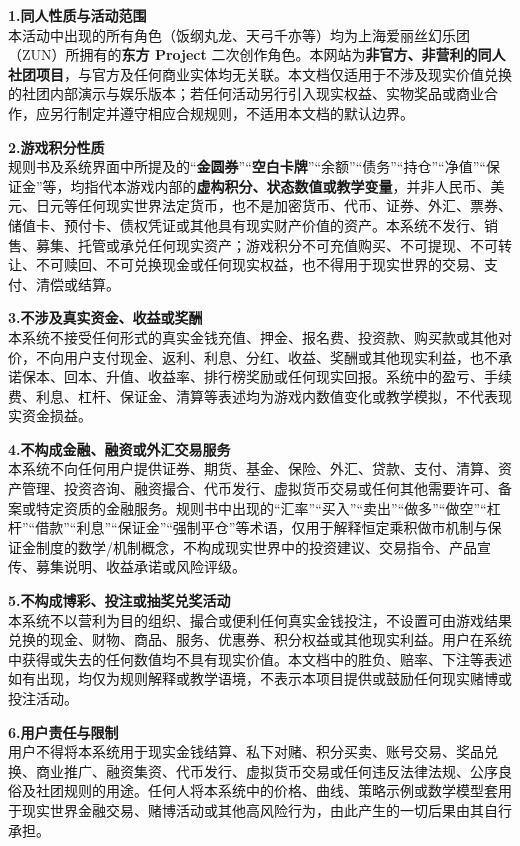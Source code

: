 \documentclass[11pt,a4paper,twoside]{article}
\begin{document}
\textbf{1.\;同人性质与活动范围}\\
本活动中出现的所有角色（饭纲丸龙、天弓千亦等）均为上海爱丽丝幻乐团（ZUN）所拥有的\textbf{东方 Project} 二次创作角色。本网站为\textbf{非官方、非营利的同人社团项目}，与官方及任何商业实体均无关联。本文档仅适用于不涉及现实价值兑换的社团内部演示与娱乐版本；若任何活动另行引入现实权益、实物奖品或商业合作，应另行制定并遵守相应合规规则，不适用本文档的默认边界。

\textbf{2.\;游戏积分性质}\\
规则书及系统界面中所提及的“\textbf{金圆券}”“\textbf{空白卡牌}”“余额”“债务”“持仓”“净值”“保证金”等，均指代本游戏内部的\textbf{虚构积分、状态数值或教学变量}，并非人民币、美元、日元等任何现实世界法定货币，也不是加密货币、代币、证券、外汇、票券、储值卡、预付卡、债权凭证或其他具有现实财产价值的资产。本系统不发行、销售、募集、托管或承兑任何现实资产；游戏积分不可充值购买、不可提现、不可转让、不可赎回、不可兑换现金或任何现实权益，也不得用于现实世界的交易、支付、清偿或结算。

\textbf{3.\;不涉及真实资金、收益或奖酬}\\
本系统不接受任何形式的真实金钱充值、押金、报名费、投资款、购买款或其他对价，不向用户支付现金、返利、利息、分红、收益、奖酬或其他现实利益，也不承诺保本、回本、升值、收益率、排行榜奖励或任何现实回报。系统中的盈亏、手续费、利息、杠杆、保证金、清算等表述均为游戏内数值变化或教学模拟，不代表现实资金损益。

\textbf{4.\;不构成金融、融资或外汇交易服务}\\
本系统不向任何用户提供证券、期货、基金、保险、外汇、贷款、支付、清算、资产管理、投资咨询、融资撮合、代币发行、虚拟货币交易或任何其他需要许可、备案或特定资质的金融服务。规则书中出现的“汇率”“买入”“卖出”“做多”“做空”“杠杆”“借款”“利息”“保证金”“强制平仓”等术语，仅用于解释恒定乘积做市机制与保证金制度的数学/机制概念，不构成现实世界中的投资建议、交易指令、产品宣传、募集说明、收益承诺或风险评级。

\textbf{5.\;不构成博彩、投注或抽奖兑奖活动}\\
本系统不以营利为目的组织、撮合或便利任何真实金钱投注，不设置可由游戏结果兑换的现金、财物、商品、服务、优惠券、积分权益或其他现实利益。用户在系统中获得或失去的任何数值均不具有现实价值。本文档中的胜负、赔率、下注等表述如有出现，均仅为规则解释或教学语境，不表示本项目提供或鼓励任何现实赌博或投注活动。

\textbf{6.\;用户责任与限制}\\
用户不得将本系统用于现实金钱结算、私下对赌、积分买卖、账号交易、奖品兑换、商业推广、融资集资、代币发行、虚拟货币交易或任何违反法律法规、公序良俗及社团规则的用途。任何人将本系统中的价格、曲线、策略示例或数学模型套用于现实世界金融交易、赌博活动或其他高风险行为，由此产生的一切后果由其自行承担。
\end{document}
